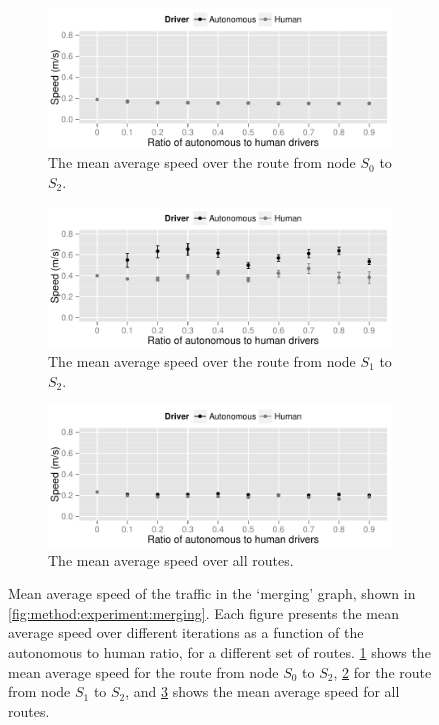 \begin{figure}
	\centering
	\begin{subfigure}{\textwidth}
		\centering
		\includegraphics[width=\textwidth]{./img/results_merging_03}
		\caption{The mean average speed over the route from node $S_0$ to $S_2$.}
		\label{fig:results:merging:03}
	\end{subfigure}
	\begin{subfigure}{\textwidth}
		\centering
		\includegraphics[width=\textwidth]{./img/results_merging_13}
		\caption{The mean average speed over the route from node $S_1$ to $S_2$.}
		\label{fig:results:merging:13}
	\end{subfigure}	
	\begin{subfigure}{\textwidth}
		\centering
		\includegraphics[width=\textwidth]{./img/results_merging}
		\caption{The mean average speed over all routes.}
		\label{fig:results:merging:all}
	\end{subfigure}		
	\caption{Mean average speed of the traffic in the `merging' graph, shown in \cref{fig:method:experiment:merging}. Each figure presents the mean average speed over different iterations as a function of the autonomous to human ratio, for a different set of routes. \ref{fig:results:merging:03} shows the mean average speed for the route from node $S_0$ to $S_2$, \ref{fig:results:merging:13} for the route from node $S_1$ to $S_2$, and \ref{fig:results:merging:all} shows the mean average speed for all routes.}
	\label{fig:results:merging}
\end{figure}

